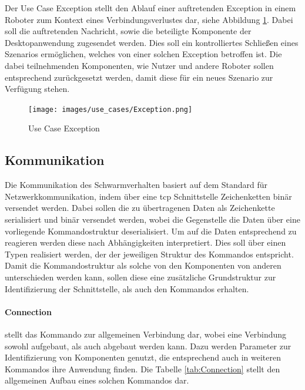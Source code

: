 Der Use Case Exception stellt den Ablauf einer auftretenden Exception in einem Roboter zum Kontext eines Verbindungsverlustes dar, siehe Abbildung \ref{fig:Exception}. Dabei soll die auftretenden Nachricht, sowie die beteiligte Komponente der Desktopanwendung zugesendet werden. Dies soll ein kontrolliertes Schließen eines Szenarios ermöglichen, welches von einer solchen Exception betroffen ist. Die dabei teilnehmenden Komponenten, wie Nutzer und andere Roboter sollen entsprechend zurückgesetzt werden, damit diese für ein neues Szenario zur Verfügung stehen.\\

\begin{figure}[h]
	\begin{center}
		\texttt{[image: images/use\_cases/Exception.png]}
	\end{center}
	\caption{Use Case Exception}
	\label{fig:Exception}
\end{figure}

\newpage
\subsection{Kommunikation}\label{kommunikation}

Die Kommunikation des Schwarmverhalten basiert auf dem Standard für Netzwerkkommunikation, indem über eine \gls{tcp} Schnittstelle Zeichenketten binär versendet werden. Dabei sollen die zu übertragenen Daten als Zeichenkette serialisiert und binär versendet werden, wobei die Gegenstelle die Daten über eine vorliegende Kommandostruktur deserialisiert. Um auf die Daten entsprechend zu reagieren werden diese nach Abhängigkeiten interpretiert. Dies soll über einen Typen realisiert werden, der der jeweiligen Struktur des Kommandos entspricht. Damit die Kommandostruktur als solche von den Komponenten von anderen unterschieden werden kann, sollen diese eine zusätzliche Grundstruktur zur Identifizierung der Schnittstelle, als auch den Kommandos erhalten. 

\paragraph{Connection} stellt das Kommando zur allgemeinen Verbindung dar, wobei eine Verbindung sowohl aufgebaut, als auch abgebaut werden kann. Dazu werden Parameter zur Identifizierung von Komponenten genutzt, die entsprechend auch in weiteren Kommandos ihre Anwendung finden. Die Tabelle \ref{tab:Connection} stellt den allgemeinen Aufbau eines solchen Kommandos dar.

